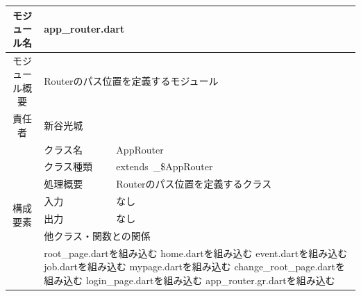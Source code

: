 \begin{table}[H]
  \centering
  \begin{tabular}{|c|l|l|} \hline
    モジュール名                & \multicolumn{2}{l|}{app\_router.dart}                                                             \\ \hline
    モジュール概要               & \multicolumn{2}{p{12cm}|}{Routerのパス位置を定義するモジュール}                                                  \\ \hline
    責任者                   & \multicolumn{2}{l|}{新谷光城}                                                                         \\ \hline
    \multirow{7}{*}{構成要素} & クラス名                                             & AppRouter                                      \\ \cline{2-3}
                          & クラス種類                                            & extends\ \_\$AppRouter                         \\ \cline{2-3}
                          & 処理概要                                             & \multicolumn{1}{p{12cm}|}{Routerのパス位置を定義するクラス} \\ \cline{2-3}
                          & 入力                                               & なし                                             \\ \cline{2-3}
                          & 出力                                               & なし                                             \\ \cline{2-3}
                          & \multicolumn{2}{l|}{他クラス・関数との関係}                                                                  \\ \cline{2-3}
                          & \multicolumn{2}{p{14cm}|}{root\_page.dartを組み込む
      \newline home.dartを組み込む
      \newline event.dartを組み込む
      \newline job.dartを組み込む
      \newline mypage.dartを組み込む
      \newline change\_root\_page.dartを組み込む
      \newline login\_page.dartを組み込む
      \newline app\_router.gr.dartを組み込む
    }                                                                                                                         \\ \hline
  \end{tabular}
\end{table}

